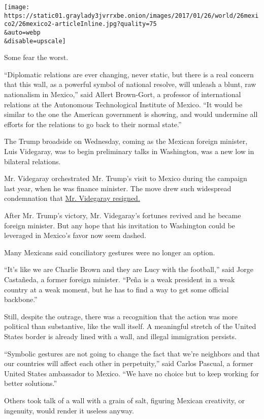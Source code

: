 \texttt{[image: https://static01.graylady3jvrrxbe.onion/images/2017/01/26/world/26mexico2/26mexico2-articleInline.jpg?quality=75\\\&auto=webp\\\&disable=upscale]}

Some fear the worst.

``Diplomatic relations are ever changing, never static, but there is a
real concern that this wall, as a powerful symbol of national resolve,
will unleash a blunt, raw nationalism in Mexico,'' said Allert
Brown-Gort, a professor of international relations at the Autonomous
Technological Institute of Mexico. ``It would be similar to the one the
American government is showing, and would undermine all efforts for the
relations to go back to their normal state.''

The Trump broadside on Wednesday, coming as the Mexican foreign
minister, Luis Videgaray, was to begin preliminary talks in Washington,
was a new low in bilateral relations.

Mr. Videgaray orchestrated Mr. Trump's visit to Mexico during the
campaign last year, when he was finance minister. The move drew such
widespread condemnation that
\href{https://www.nytimes3xbfgragh.onion/2016/09/08/world/americas/mexico-finance-minister-luis-videgaray-resigns.html}{Mr.
Videgaray resigned.}

After Mr. Trump's victory, Mr. Videgaray's fortunes revived and he
became foreign minister. But any hope that his invitation to Washington
could be leveraged in Mexico's favor now seem dashed.

Many Mexicans said conciliatory gestures were no longer an option.

``It's like we are Charlie Brown and they are Lucy with the football,''
said Jorge Castañeda, a former foreign minister. ``Peña is a weak
president in a weak country at a weak moment, but he has to find a way
to get some official backbone.''

Still, despite the outrage, there was a recognition that the action was
more political than substantive, like the wall itself. A meaningful
stretch of the United States border is already lined with a wall, and
illegal immigration persists.

``Symbolic gestures are not going to change the fact that we're
neighbors and that our countries will affect each other in perpetuity,''
said Carlos Pascual, a former United States ambassador to Mexico. ``We
have no choice but to keep working for better solutions.''

Others took talk of a wall with a grain of salt, figuring Mexican
creativity, or ingenuity, would render it useless anyway.


